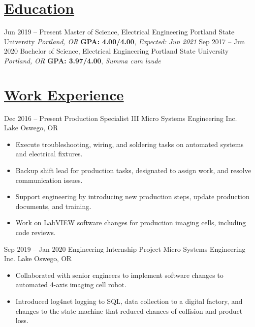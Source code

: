 \documentclass[letterpaper,11pt]{moderncv}        %
\begin{document}
\makecvtitle
\vspace*{-1.0cm}
    
\section{\underline{Education}}

\cventry
{Jun 2019 -- Present}
{Master of Science, Electrical Engineering}
{Portland State University}
{\textit{Portland, OR}}
{}
{\textbf{GPA: 4.00/4.00}, \textit{Expected: Jun 2021}}
{}
\cventry
{Sep 2017 -- Jun 2020}
{Bachelor of Science, Electrical Engineering}
{Portland State University}
{\textit{Portland, OR}}
{}
{\textbf{GPA: 3.97/4.00}, \textit{Summa cum laude}}
{}

\section{\underline{Work Experience}}
\cventry
{Dec 2016 -- Present}
{Production Specialist III}
{Micro Systems Engineering Inc.}
{Lake Oswego, OR}
{}
{\begin{itemize}%
		\item Execute troubleshooting, wiring, and soldering tasks on automated systems and electrical fixtures.
		\item Backup shift lead for production tasks, designated to assign work, and resolve communication issues.
		\item Support engineering by introducing new production steps, update production documents, and  training.
		\item Work on LabVIEW software changes for production imaging cells, including code reviews.
	\end{itemize}}
	
\cventry
{Sep 2019 -- Jan 2020}
{Engineering Internship Project}
{Micro Systems Engineering Inc.}
{Lake Oswego, OR}
{}
{\begin{itemize}%
 \item Collaborated with senior engineers to implement software changes to automated 4-axis imaging cell robot.
 \item Introduced log4net logging to SQL, data collection to a digital factory, and changes to the state machine that reduced chances of collision and product loss.
	\end{itemize}}
	
	
\end{document}
